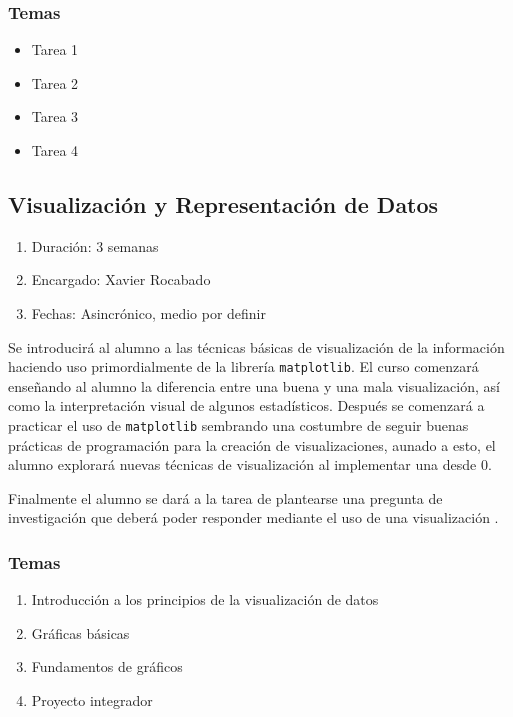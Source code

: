 \documentclass{article}
\begin{document}
            \subsubsection{Temas}

                \begin{itemize}
                    \item Tarea 1
                    \item Tarea 2
                    \item Tarea 3
                    \item Tarea 4
                \end{itemize}

        \subsection{Visualización y Representación de Datos}

            \begin{enumerate}
                \item Duración: 3 semanas
                \item Encargado: Xavier Rocabado
                \item Fechas: Asincrónico, medio por definir
            \end{enumerate}

            Se introducirá al alumno a las técnicas básicas de visualización de la información haciendo uso primordialmente de la librería \texttt{matplotlib}. El curso comenzará enseñando al alumno la diferencia entre una buena y una mala visualización, así como la interpretación visual de algunos estadísticos. Después se comenzará a practicar el uso de \texttt{matplotlib} sembrando una costumbre de seguir buenas prácticas de programación para la creación de visualizaciones, aunado a esto, el alumno explorará nuevas técnicas de visualización al implementar una desde 0. 
            
            Finalmente el alumno se dará a la tarea de plantearse una pregunta de investigación que deberá poder responder mediante el uso de una visualización \cite{plotting}.

            \subsubsection{Temas}

                \begin{enumerate}
                    \item Introducción a los principios de la visualización de datos
                    \item Gráficas básicas
                    \item Fundamentos de gráficos
                    \item Proyecto integrador
                \end{enumerate}
\end{document}
